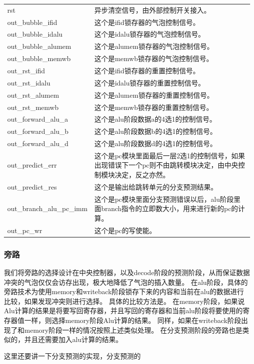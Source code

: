 \begin{center}
\begin{longtable}{p{}p{}}
            rst & 异步清空信号，由外部控制开关接入。\\
            out\_bubble\_ifid & 这个是ifid锁存器的气泡控制信号。\\
            out\_bubble\_idalu & 这个是idalu锁存器的气泡控制信号。\\
            out\_bubble\_alumem & 这个是alumem锁存器的气泡控制信号。\\
            out\_bubble\_memwb & 这个是memwb锁存器的气泡控制信号。\\
            out\_rst\_ifid & 这个是ifid锁存器的重置控制信号。\\
            out\_rst\_idalu & 这个是idalu锁存器的重置控制信号。\\
            out\_rst\_alumem & 这个是alumem锁存器的重置控制信号。\\
            out\_rst\_memwb & 这个是memwb锁存器的重置控制信号。\\
            out\_forward\_alu\_a & 这个是alu阶段数据a的4选1的控制信号。\\
            out\_forward\_alu\_b & 这个是alu阶段数据b的4选1的控制信号。\\
            out\_forward\_alu\_d & 这个是alu阶段数据d的4选1的控制信号。\\
            out\_predict\_err & 这个是pc模块里面最后一层2选1的控制信号，如果出现错误下一个pc则不由跳转模块决定，由中央控制模块决定，反之亦然。\\
            out\_predict\_res & 这个是输出给跳转单元的分支预测结果。\\
            out\_branch\_alu\_pc\_imm & 这个是pc模块里面分支预测错误以后，alu阶段里面branch指令的立即数大小，用来进行新的pc的计算。\\
            out\_pc\_wr & 这个是pc的写使能。\\
        \bottomrule
    \end{longtable}
\end{center}

\subsubsection{旁路}
我们将旁路的选择设计在中央控制器，以及decode阶段的预测阶段，从而保证数据冲突的气泡仅仅会访存出现，极大地降低了气泡的插入数量。
在alu阶段，具体的旁路技术为使用memory和writeback阶段锁存下来的内容和当前在alu的数据进行比较，如果发现冲突则进行选择。
具体的比较方法是。
在memory阶段，如果说Alu计算的结果是将要写回寄存器，并且写回的寄存器和当前alu阶段将要使用的寄存器值一样，则选择memory阶段Alu计算的结果。
同样，如果在writeback阶段出现了和memory阶段一样的情况按照上述类似处理。
在分支预测阶段的旁路也是类似的，并且还需要加入alu计算的结果。

这里还要讲一下分支预测的实现，分支预测的

        